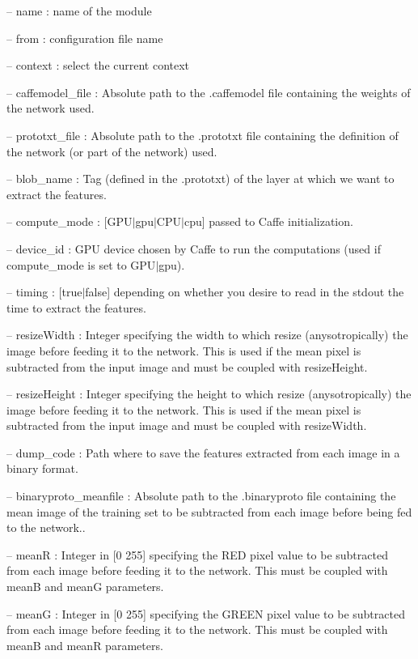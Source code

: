 \begin{DoxyItemize}
\item -- name \+: name of the module
\item -- from \+: configuration file name
\item -- context \+: select the current context
\item -- caffemodel\+\_\+file \+: Absolute path to the .caffemodel file containing the weights of the network used.
\item -- prototxt\+\_\+file \+: Absolute path to the .prototxt file containing the definition of the network (or part of the network) used.
\item -- blob\+\_\+name \+: Tag (defined in the .prototxt) of the layer at which we want to extract the features.
\item -- compute\+\_\+mode \+: \mbox{[}G\+P\+U$\vert$gpu$\vert$\+C\+P\+U$\vert$cpu\mbox{]} passed to Caffe initialization.
\item -- device\+\_\+id \+: G\+PU device chosen by Caffe to run the computations (used if compute\+\_\+mode is set to G\+P\+U$\vert$gpu).
\item -- timing \+: \mbox{[}true$\vert$false\mbox{]} depending on whether you desire to read in the stdout the time to extract the features.
\item -- resize\+Width \+: Integer specifying the width to which resize (anysotropically) the image before feeding it to the network. This is used if the mean pixel is subtracted from the input image and must be coupled with {\ttfamily resize\+Height}.
\item -- resize\+Height \+: Integer specifying the height to which resize (anysotropically) the image before feeding it to the network. This is used if the mean pixel is subtracted from the input image and must be coupled with {\ttfamily resize\+Width}.
\item -- dump\+\_\+code \+: Path where to save the features extracted from each image in a binary format.
\item -- binaryproto\+\_\+meanfile \+: Absolute path to the .binaryproto file containing the mean image of the training set to be subtracted from each image before being fed to the network..
\item -- meanR \+: Integer in \mbox{[}0 255\mbox{]} specifying the R\+ED pixel value to be subtracted from each image before feeding it to the network. This must be coupled with {\ttfamily meanB} and {\ttfamily meanG} parameters.
\item -- meanG \+: Integer in \mbox{[}0 255\mbox{]} specifying the G\+R\+E\+EN pixel value to be subtracted from each image before feeding it to the network. This must be coupled with {\ttfamily meanB} and {\ttfamily meanR} parameters.

\end{DoxyItemize}
